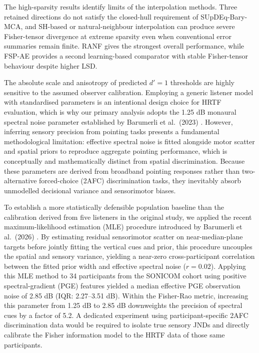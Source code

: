 \documentclass[journal]{IEEEtran}
\begin{document}
The high-sparsity results identify limits of the interpolation methods. Three retained directions do not satisfy the closed-hull requirement of SUpDEq-Bary-MCA, and SH-based or natural-neighbour interpolation can produce severe Fisher-tensor divergence at extreme sparsity even when conventional error summaries remain finite. RANF gives the strongest overall performance, while FSP-AE provides a second learning-based comparator with stable Fisher-tensor behaviour despite higher LSD.

The absolute scale and anisotropy of predicted $d'=1$ thresholds are highly sensitive to the assumed observer calibration. Employing a generic listener model with standardised parameters is an intentional design choice for HRTF evaluation, which is why our primary analysis adopts the 1.25 dB monaural spectral noise parameter established by Barumerli et al.\ (2023) \cite{Barumerli2023}. However, inferring sensory precision from pointing tasks presents a fundamental methodological limitation: effective spectral noise is fitted alongside motor scatter and spatial priors to reproduce aggregate pointing performance, which is conceptually and mathematically distinct from spatial discrimination. Because these parameters are derived from broadband pointing responses rather than two-alternative forced-choice (2AFC) discrimination tasks, they inevitably absorb unmodelled decisional variance and sensorimotor biases.

To establish a more statistically defensible population baseline than the calibration derived from five listeners in the original study, we applied the recent maximum-likelihood estimation (MLE) procedure introduced by Barumerli et al.\ (2026) \cite{Barumerli2026}. By estimating residual sensorimotor scatter on near-median-plane targets before jointly fitting the vertical cues and prior, this procedure uncouples the spatial and sensory variance, yielding a near-zero cross-participant correlation between the fitted prior width and effective spectral noise ($r = 0.02$). Applying this MLE method to 34 participants from the SONICOM cohort using positive spectral-gradient (PGE) features yielded a median effective PGE observation noise of 2.85 dB (IQR: 2.27--3.51 dB). Within the Fisher-Rao metric, increasing this parameter from 1.25 dB to 2.85 dB downweights the precision of spectral cues by a factor of 5.2. A dedicated experiment using participant-specific 2AFC discrimination data would be required to isolate true sensory JNDs and directly calibrate the Fisher information model to the HRTF data of those same participants.
\end{document}

